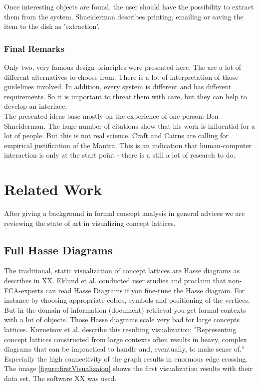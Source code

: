 \documentclass[11pt]{report}
\begin{document}
Once interesting objects are found, the user should have the possibility to extract them from the system. Shneiderman describes printing, emailing or saving the item to the disk as 'extraction'.

\subsection{Final Remarks}

Only two, very famous design principles were presented here. The are a lot of different alternatives to choose from. There is a lot of interpretation of those guidelines involved. In addition, every system is different and has different requirements. So it is important to threat them with care, but they can help to develop an interface. \\

The presented ideas base mostly on the experience of one person: Ben Shneiderman. The huge number of citations show that his work is influential for a lot of people. But this is not real science. Craft and Cairns \cite{Craft2005} are calling for empirical justification of the Mantra. This is an indication that human-computer interaction is only at the start point - there is a still a lot of research to do.

\chapter{Related Work}

After giving a background in formal concept analysis in general advices we are reviewing the state of art in visualizing concept lattices.

\section{Full Hasse Diagrams}

The traditional, static visualization of concept lattices are Hasse diagrams as describes in XX. Eklund et al. \cite{Eklund2004} conducted user studies and proclaim that non-FCA-experts can read Hasse Diagrams if you fine-tune the Hasse diagram. For instance by choosing appropriate colors, symbols and positioning of the vertices. \\

But in the domain of information (document) retrieval you get formal contexts with a lot of objects. Those Hasse diagrams scale very bad for large concepts lattices. Kuznetsov et al. \cite{Kuznetsov20072}  describe this resulting visualization: "Representing concept lattices constructed from large contexts often results in heavy, complex diagrams that can be impractical to handle and, eventually, to make sense of." Especially the high connectivity of the graph results in enormous edge crossing. The image \ref{figure:firstVisualizaion} shows the first visualization results with their data set. The software XX was used. \\
\end{document}
